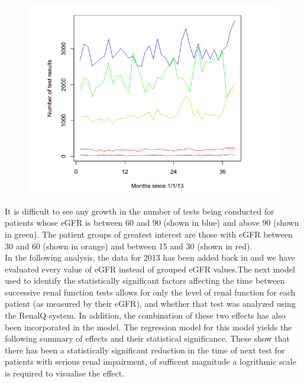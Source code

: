 ﻿\documentclass[11pt]{article}
\begin{document}
\begin{figure}[htp]
\centering
\includegraphics[scale=0.50]{fig6.png}
\caption{}
\label{}
\end{figure}

It is difficult to see any growth in the number of tests being conducted for patients whose eGFR is between 60 and 90 (shown in blue) and above 90 (shown in green). The patient groups of greatest interest are those with eGFR between 30 and 60 (shown in orange) and between 15 and 30 (shown in red).\\

In the following analysis, the data for 2013 has been added back in and we have evaluated every value of eGFR instead of grouped eGFR values.The next  model  used to identify the statistically significant factors affecting the time between successive renal function tests allows for only the level of renal function for each patient (as measured by their eGFR), and whether that test was analyzed using the RenalQ system. In addition, the combination of these two effects has also been incorporated in the model. The regression model for this model yields  the following summary of effects and their statistical significance. These show that there has been a statistically significant reduction in the time of next test for patients with serious renal impairment, of sufficent magnitude a logrithmic scale is required to visualise the effect.\\
\end{document}
